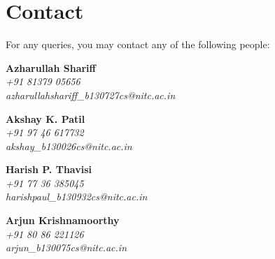 \chapter{Contact}

For any queries, you may contact any of the following people: 
\vspace{5mm}

\textbf{Azharullah Shariff}\\
\textit{+91 81379 05656}\\
\textit{azharullahshariff\_b130727cs@nitc.ac.in}

\vspace{5mm}

\textbf{Akshay K. Patil}\\
\textit{+91 97 46 617732}\\
\textit{akshay\_b130026cs@nitc.ac.in}

\vspace{5mm}

\textbf{Harish P. Thavisi}\\
\textit{+91 77 36 385045}\\
\textit{harishpaul\_b130932cs@nitc.ac.in}

\vspace{5mm}

\textbf{Arjun Krishnamoorthy}\\
\textit{+91 80 86 221126}\\
\textit{arjun\_b130075cs@nitc.ac.in}